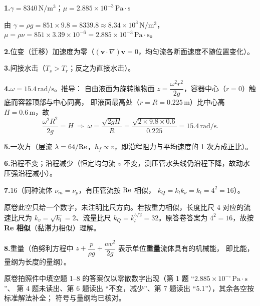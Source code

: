 
\noindent\textbf{1.}\quad $\gamma=8340\,\mathrm{N/m^3}$；\quad $\mu=2.885\times10^{-3}\,\mathrm{Pa\cdot s}$

\noindent 由 $\gamma=\rho g=851\times9.8=8339.8\approx8.34\times10^{3}\,\mathrm{N/m^3}$，
$\mu=\rho\nu=851\times3.39\times10^{-6}=2.885\times10^{-3}\,\mathrm{Pa\cdot s}$。

\smallskip
\noindent\textbf{2.}\quad 位变（迁移）加速度为零（$(\bm v\cdot\nabla)\bm v=0$，均匀流各断面速度不随位置变化）。

\noindent\textbf{3.}\quad 间接水击（$T_s>T_r$；反之为直接水击）。

\noindent\textbf{4.}\quad $\omega=15.4\,\mathrm{rad/s}$。推导：
自由液面为旋转抛物面 $z=\dfrac{\omega^2r^2}{2g}$，容器中心（$r=0$）触底而容器顶部与中心同高，
即液面最高处（$r=R=0.225\,\mathrm{m}$）比中心高 $H=0.6\,\mathrm{m}$，故
\[
\frac{\omega^2R^2}{2g}=H\ \Longrightarrow\
\omega=\frac{\sqrt{2gH}}{R}=\frac{\sqrt{2\times9.8\times0.6}}{0.225}=15.4\,\mathrm{rad/s}.
\]

\noindent\textbf{5.}\quad 一次方（层流 $\lambda=64/\mathrm{Re}$，$h_f\propto v$，即沿程阻力与平均速度的 1 次方成正比）。

\noindent\textbf{6.}\quad 沿程不变；沿程减少（恒定均匀流 $v$ 不变，测压管水头线仍沿程下降，故动水压强沿程减小）。

\noindent\textbf{7.}\quad $16$（同种流体 $\nu_m=\nu_p$，有压管流按 $\mathrm{Re}$ 相似，
$k_Q=k_lk_\nu=k_l=4^2=16$）。

\begin{tishi}
原卷此空只给一个数字，未注明比尺方向。若按重力相似，长度比尺 4 对应的流速比尺为
$k_v=\sqrt{k_l}=2$、流量比尺 $k_Q=k_l^{5/2}=32$。原答卷答案为 $4^2=16$，故按 \textbf{Re 相似}（黏滞力相似）理解。
\end{tishi}

\noindent\textbf{8.}\quad 重量（伯努利方程中 $z+\dfrac{p}{\rho g}+\dfrac{\alpha v^2}{2g}$ 表示单位\textbf{重量}流体具有的机械能，
即比能，量纲为长度的量纲）。

\begin{tishi}
原卷拍照件中填空题 1--8 的答案仅以零散数字出现（第 1 题 ``$2.885\times10^{-\square}\,\mathrm{Pa\cdot s}$''、
第 4 题未读出、第 6 题读出 ``不变，减少''、第 7 题读出 ``5.1''），其余各空按标准解法补全；
符号与量纲均已核对。
\end{tishi}


